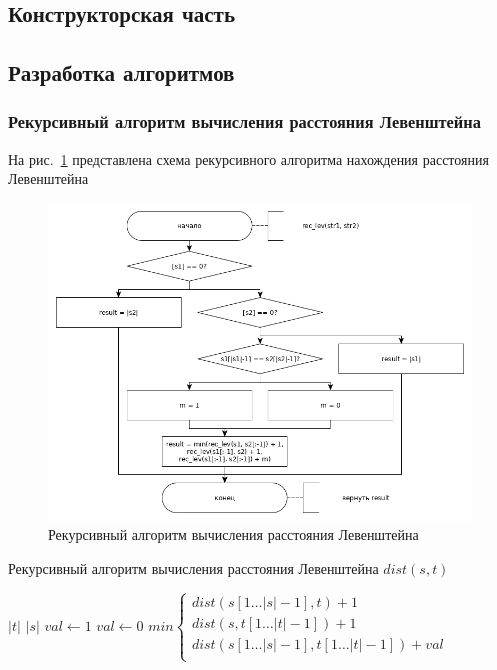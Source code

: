 \documentclass[a4paper,12pt]{article}
\begin{document}
    \newpage

    \begin{center}
        \section{Конструкторская часть}
        \subsection{Разработка алгоритмов}
        \subsubsection{Рекурсивный алгоритм вычисления расстояния Левенштейна}
    \end{center}
    На рис.~\ref{ris:rec_sheme} представлена схема рекурсивного алгоритма нахождения расстояния Левенштейна
		 		\begin{figure}[h]
		 			\centering
		 			{
		 				\includegraphics[scale=0.51]{lrec.png}
		 				\caption{Рекурсивный алгоритм вычисления расстояния Левенштейна}
			 			\label{ris:rec_sheme}
		 			}
		 		\end{figure}
	
	\begin{algorithm}
		\caption{Рекурсивный алгоритм вычисления расстояния Левенштейна $dist(s, t)$}
		\begin{algorithmic}
				\State \Return $|t|$
			\EndIf
				\State \Return $|s|$
			\EndIf
			\State $val \gets 1$
				\State $val \gets 0$
			\EndIf
			\State \Return $min
				\begin{cases}
					dist(s[1 \dots |s|-1], t)+1 \\
					dist(s, t[1 \dots |t|-1])+1 \\					
					dist(s[1 \dots |s|-1], t[1 \dots |t|-1])+val \\			
				\end{cases}$						
		\end{algorithmic}
	\end{algorithm}
    \newpage
    
\end{document}
